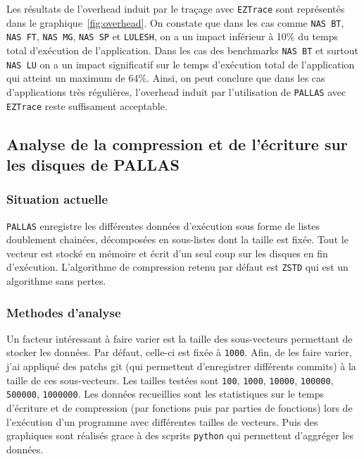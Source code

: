 Les résultats de l'overhead induit par le traçage avec \verb!EZTrace! sont représentés dans le graphique~\ref{fig:overhead}.
On constate que dans les cas comme \verb!NAS BT!, \verb!NAS FT!, \verb!NAS MG!, \verb!NAS SP! et \verb!LULESH!, on a un impact inférieur à 10\% du temps total d'exécution de l'application.
Dans les cas des benchmarks \verb!NAS BT! et surtout \verb!NAS LU! on a un impact significatif sur le temps d'exécution total de l'application qui atteint un maximum de 64\%.
Ainsi, on peut conclure que dans les cas d'applications très régulières, l'overhead induit par l'utilisation de \verb!PALLAS! avec \verb!EZTrace! reste suffisament acceptable.

\subsection{Analyse de la compression et de l'écriture sur les disques de PALLAS}\label{ssce:wrt_write}

\subsubsection{Situation actuelle}\label{ssec:wrt_situ}

\verb!PALLAS! enregistre les différentes données d'exécution sous forme de listes doublement chainées, décomposées en sous-listes dont la taille est fixée.
Tout le vecteur est stocké en mémoire et écrit d'un seul coup sur les disques en fin d'exécution.
L'algorithme de compression retenu par défaut est \verb!ZSTD! qui est un algorithme sans pertes.

\subsubsection{Methodes d'analyse}\label{ssec:wrt_analysis}

Un facteur intéressant à faire varier est la taille des sous-vecteurs permettant de stocker les données. Par défaut, celle-ci est fixée à \verb!1000!.
Afin, de les faire varier, j'ai appliqué des patchs git (qui permettent d'enregistrer différents commits) à la taille de ces sous-vecteurs.
Les tailles testées sont \verb!100!, \verb!1000!, \verb!10000!, \verb!100000!, \verb!500000!, \verb!1000000!.
Les données recueillies sont les statistiques sur le temps d'écriture et de compression (par fonctions puis par parties de fonctions) lors de l'exécution
d'un programme avec différentes tailles de vecteurs.
Puis des graphiques sont réalisés grace à des scprits \verb!python! qui permettent d'aggréger les données. 

